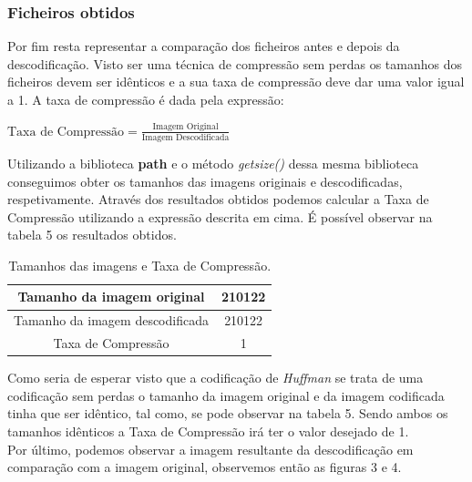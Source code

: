 \documentclass[12pt,a4paper]{article}
\begin{document}
\subsubsection{Ficheiros obtidos}
Por fim resta representar a comparação dos ficheiros antes e depois da descodificação. Visto ser uma técnica de compressão sem perdas os tamanhos dos ficheiros devem ser idênticos e a sua taxa de compressão deve dar uma valor igual a 1. A taxa de compressão é dada pela expressão:

\begin{center}
$\text{Taxa de Compressão} = \frac{\text{Imagem Original}}{\text{Imagem Descodificada}}$
\end{center}

Utilizando a biblioteca \textbf{path} e o método \textit{getsize()} dessa mesma biblioteca conseguimos obter os tamanhos das imagens originais e descodificadas, respetivamente. Através dos resultados obtidos podemos calcular a Taxa de Compressão utilizando a expressão descrita em cima. É possível observar na tabela 5 os resultados obtidos.

\begin{table}[h]
\centering
\label{my-label}
\begin{tabular}{|c|c|}
\hline
Tamanho da imagem original       & 210122 \\ 
\hline
Tamanho da imagem descodificada  & 210122 \\ 
\hline
Taxa de Compressão               & 1      \\ 
\hline
\end{tabular}
\caption{Tamanhos das imagens e Taxa de Compressão.}
\end{table}

Como seria de esperar visto que a codificação de \textit{Huffman} se trata de uma codificação sem perdas o tamanho da imagem original e da imagem codificada tinha que ser idêntico, tal como, se pode observar na tabela 5. Sendo ambos os tamanhos idênticos a Taxa de Compressão irá ter o valor desejado de 1.\\

Por último, podemos observar a imagem resultante da descodificação em comparação com a imagem original, observemos então as figuras 3 e 4.
\end{document}
